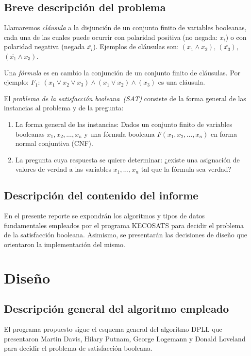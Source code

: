 \documentclass[12pt,lettersize,oneside]{article}
\begin{document}
\subsection{Breve descripción del problema} 
Llamaremos \emph{cláusula} a la disjunción de un conjunto finito de variables
booleanas, cada una de las cuales puede ocurrir con polaridad positiva (no
negada: $x_i$) o con polaridad negativa (negada $\overline{x_i}$).  
Ejemplos de cláusulas son: $(x_1 \wedge x_2)$, $(\overline{x_3})$,
$(\overline{x_1} \wedge x_3)$.

Una \emph{fórmula} es en cambio la conjunción de un conjunto finito de
cláusulas. Por ejemplo: $F_1:\ (x_1 \vee x_2 \vee \overline{x_3}) \wedge (x_1
\vee \overline{x_2}) \wedge (\overline{x_3})$ es una cláusula.

El \emph{problema de la satisfacción booleana~(SAT)} consiste de la
forma general de las instancias al problema y de la pregunta: \vspace{-2.5mm}
\begin{enumerate}
\item La forma general de las instancias: Dados un conjunto finito de variables
  booleanas $x_1,x_2,\ldots,x_n$ y una fórmula booleana $F(x_1,x_2,\ldots,x_n)$
  en forma normal conjuntiva (CNF).
\item La pregunta cuya respuesta se quiere determinar: ¿existe una asignación de
  valores de verdad a las variables $x_1,\ldots, x_n$ tal que la fórmula sea
  verdad?
\end{enumerate}

\subsection{Descripción del contenido del informe}
En el presente reporte se expondrán los algoritmos y tipos de datos
fundamentales empleados por el programa KECOSATS para decidir el problema de la
satisfacción booleana. Asimismo, se presentarán las decisiones de diseño que
orientaron la implementación del mismo.

\section{Diseño}

\subsection{Descripción general del algoritmo empleado}
El programa propuesto sigue el esquema general del algoritmo DPLL que presentaron
Martin Davis, Hilary Putnam, George Logemann y Donald Loveland para decidir el
problema de satisfacción booleana.
\end{document}
